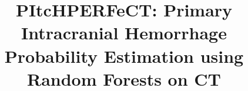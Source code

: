 \documentclass{elsarticle_nonatbib}\usepackage[]{graphicx}\usepackage[]{color}
\begin{document}
\graphicspath{{figures/}} %


\begin{frontmatter}

\date{}

\title{PItcHPERFeCT: Primary Intracranial Hemorrhage Probability Estimation using Random Forests on CT}









\address[jhsph]{Department of Biostatistics, Bloomberg School of Public Health, Johns Hopkins University, Baltimore, MD, USA}
\address[jhmi]{Department of Neurology, Division of Brain Injury Outcomes,  Johns Hopkins Medical Institutions, Baltimore, MD, USA}
\address[ucla]{Department of Neurosurgery, David Geffen School of Medicine at UCLA, Los Angeles, CA, USA}


\begin{abstract}


\end{abstract}
\end{frontmatter}
\end{document}
